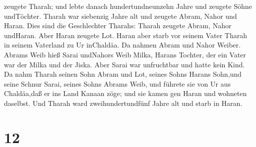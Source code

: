 zeugete Tharah;  und lebte danach hundertundneunzehn Jahre
und zeugete Söhne undTöchter.  Tharah war siebenzig Jahre
alt und zeugete Abram, Nahor und Haran.  Dies sind die
Geschlechter Tharahs: Tharah zeugete Abram, Nahor undHaran. Aber Haran
zeugete Lot.  Haran aber starb vor seinem Vater Tharah in
seinem Vaterland zu Ur inChaldäa.  Da nahmen Abram und
Nahor Weiber. Abrams Weib hieß Sarai undNahors Weib Milka, Harans
Tochter, der ein Vater war der Milka und der Jiska.  Aber
Sarai war unfruchtbar und hatte kein Kind.  Da nahm Tharah
seinen Sohn Abram und Lot, seines Sohns Harans Sohn,und seine Schnur
Sarai, seines Sohns Abrams Weib, und führete sie von Ur aus Chaldäa,daß
er ins Land Kanaan zöge; und sie kamen gen Haran und wohneten daselbst.
 Und Tharah ward zweihundertundfünf Jahre alt und starb in
Haran.

\hypertarget{section-11}{%
\section{12}\label{section-11}}


